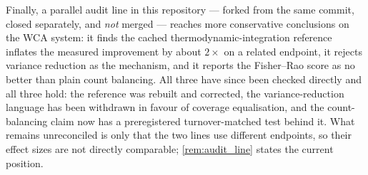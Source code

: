 Finally, a parallel audit line in this repository --- forked from the same commit, closed
separately, and \emph{not} merged --- reaches more conservative conclusions on the WCA system:
it finds the cached thermodynamic-integration reference inflates the measured improvement by
about $2\times$ on a related endpoint, it rejects variance reduction as the mechanism, and it
reports the Fisher--Rao score as no better than plain count balancing. All three have since
been checked directly and all three hold: the reference was rebuilt and corrected, the
variance-reduction language has been withdrawn in favour of coverage equalisation, and the
count-balancing claim now has a preregistered turnover-matched test behind it. What remains
unreconciled is only that the two lines use different endpoints, so their effect sizes are not
directly comparable; \cref{rem:audit_line} states the current position.
